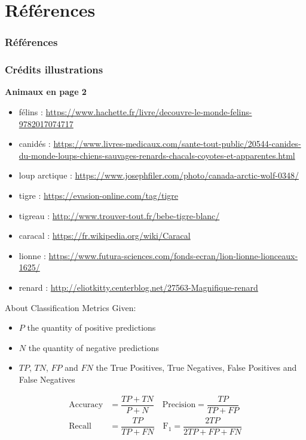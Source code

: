 \documentclass[11pt,aspectratio=169]{beamer}
\begin{document}
\section{Références}

\begin{frame}
\frametitle{Références}
\printbibliography
\end{frame}

\begin{frame}[noframenumbering]
    \frametitle{Crédits illustrations}
    \textbf{Animaux en page 2}
    \begin{itemize}
        \item félins : \url{https://www.hachette.fr/livre/decouvre-le-monde-felins-9782017074717}
        \item canidés : \url{https://www.livres-medicaux.com/sante-tout-public/20544-canides-du-monde-loups-chiens-sauvages-renards-chacals-coyotes-et-apparentes.html}
        \item loup arctique : \url{https://www.josephfiler.com/photo/canada-arctic-wolf-0348/}
        \item tigre : \url{https://evasion-online.com/tag/tigre}
        \item tigreau : \url{http://www.trouver-tout.fr/bebe-tigre-blanc/}
        \item caracal : \url{https://fr.wikipedia.org/wiki/Caracal}
        \item lionne : \url{https://www.futura-sciences.com/fonds-ecran/lion-lionne-lionceaux-1625/}
        \item renard : \url{http://eliotkitty.centerblog.net/27563-Magnifique-renard}
    \end{itemize}
    \end{frame}


\appendix

\begin{frame}{About Classification Metrics}
    Given:
    \begin{itemize}
        \item $P$ the quantity of positive predictions
        \item $N$ the quantity of negative predictions
        \item $\mathit{TP}$, $\mathit{TN}$, $\mathit{FP}$ and $\mathit{FN}$ the True Positives, True Negatives, False Positives and False Negatives
    \end{itemize}
        \begin{align}
        \text{Accuracy} & = \dfrac{\mathit{TP} + \mathit{TN}}{P+N} \quad
        \text{Precision} = \dfrac{\mathit{TP}}{\mathit{TP}+\mathit{FP}} \\[0.5ex]
        \text{Recall} & = \dfrac{\mathit{TP}}{\mathit{TP}+\mathit{FN}}\quad 
        \text{F}_1 = \dfrac{2\mathit{TP}}{2\mathit{TP}+\mathit{FP}+\mathit{FN}}
    \end{align}
    \end{frame}
    
\end{document}
